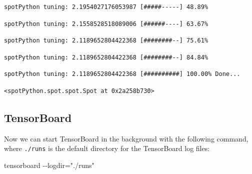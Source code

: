\documentclass[
  letterpaper,
  DIV=11,
  numbers=noendperiod]{scrreprt}
\newenvironment{Shaded}{\begin{snugshade}}{\end{snugshade}}
\newcommand{\NormalTok}[1]{\textcolor[rgb]{0.00,0.23,0.31}{#1}}
\begin{document}
\begin{verbatim}
spotPython tuning: 2.1954027176053987 [#####-----] 48.89% 
\end{verbatim}

\begin{verbatim}
spotPython tuning: 2.1558528518089006 [######----] 63.67% 
\end{verbatim}

\begin{verbatim}
spotPython tuning: 2.1189652804422368 [########--] 75.61% 
\end{verbatim}

\begin{verbatim}
spotPython tuning: 2.1189652804422368 [########--] 84.84% 
\end{verbatim}

\begin{verbatim}
spotPython tuning: 2.1189652804422368 [##########] 100.00% Done...
\end{verbatim}

\begin{verbatim}
<spotPython.spot.spot.Spot at 0x2a258b730>
\end{verbatim}

\hypertarget{sec-tensorboard-10}{%
\subsection{TensorBoard}\label{sec-tensorboard-10}}

Now we can start TensorBoard in the background with the following
command, where \texttt{./runs} is the default directory for the
TensorBoard log files:

\begin{Shaded}
\begin{Highlighting}[]
\NormalTok{tensorboard {-}{-}logdir="./runs"}
\end{Highlighting}
\end{Shaded}
\end{document}
